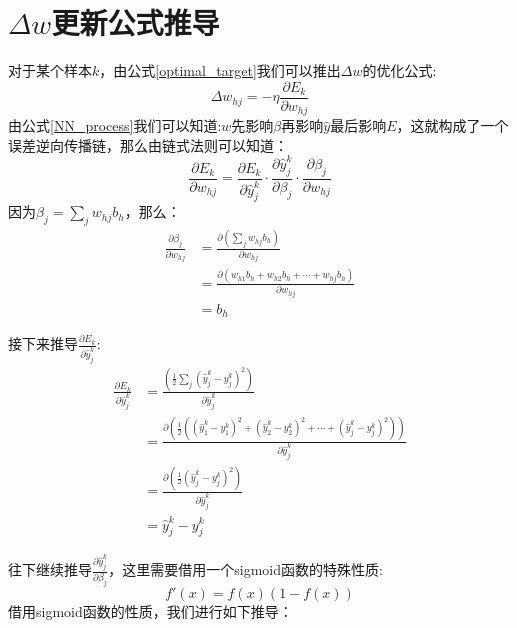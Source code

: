 \documentclass[11pt]{report}
\begin{document}
\section{$\Delta w$更新公式推导}
对于某个样本$k$，由公式\ref{optimal_target}我们可以推出$\Delta w$的优化公式:
\begin{equation}
\label{delta_w}
	\Delta w_{hj}=-\eta\frac{\partial E_k}{\partial w_{hj}}
\end{equation}
由公式\ref{NN_process}我们可以知道:$w$先影响$\beta$再影响$\hat{y}$最后影响$E$，这就构成了一个误差逆向传播链，那么由链式法则可以知道：
\begin{equation}
\label{w_123}
	\frac{\partial E_k}{\partial w_{hj}}=\frac{\partial E_k}{\partial \hat{y}_j^k}\cdot\frac{\partial \hat{y}_j^k}{\partial \beta_j}\cdot\frac{\partial \beta_j}{\partial w_{hj}}
\end{equation}
因为$\beta_j=\sum_j w_{hj}b_h$，那么：
\begin{equation}
\label{w_3}
\begin{split}
	\frac{\partial \beta_j}{\partial w_{hj}}&=\frac{\partial\left(\sum_j w_{hj}b_h \right)}{\partial w_{hj}}\\
		&=\frac{\partial\left(w_{h1}b_h+w_{h2}b_h+\cdots+w_{hj}b_h \right)}{\partial w_{hj}}\\
		&=b_h
\end{split}	
\end{equation}
\par
接下来推导$\frac{\partial E_k}{\partial \hat{y}_j^k}$:
\begin{equation}
\label{w_1}
	\begin{split}
		\frac{\partial E_k}{\partial \hat{y}_j^k}&=\frac{\left(\frac{1}{2}\sum_j(\hat{y}_j^k-y_j^k)^2 \right)}{\partial \hat{y}_j^k}\\
		&=\frac{\partial\left(\frac{1}{2}\left((\hat{y}_1^k-y_1^k)^2+(\hat{y}_2^k-y_2^k)^2+\cdots+(\hat{y}_j^k-y_j^k)^2\right) \right)}{\partial \hat{y}_j^k}\\
		&=\frac{\partial\left(\frac{1}{2} (\hat{y}_j^k-y_j^k)^2\right)}{\partial \hat{y}_j^k}\\
		&=\hat{y}_j^k-y_j^k
	\end{split}
\end{equation}
\par
往下继续推导$\frac{\partial \hat{y}_j^k}{\partial \beta_j}$，这里需要借用一个sigmoid函数的特殊性质:
\begin{equation}
\label{sigmoid_xingzhi}
	f'(x)=f(x)(1-f(x))
\end{equation}
借用sigmoid函数的性质，我们进行如下推导：
\end{document}
